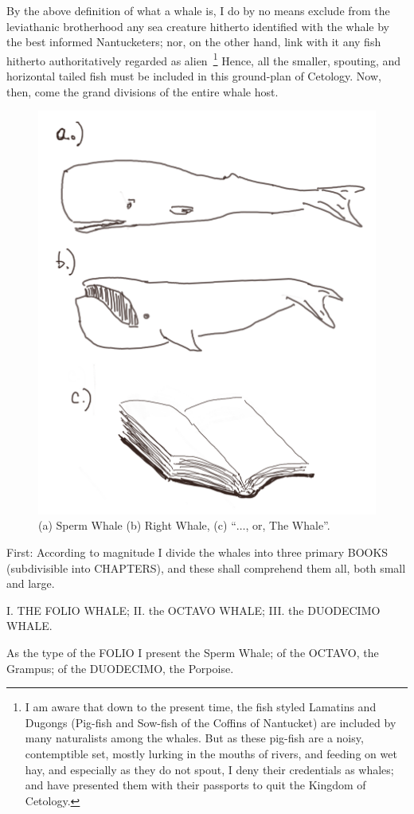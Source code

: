 By the above definition of what a whale is, I do by no means exclude from the leviathanic brotherhood any sea creature hitherto identified with the whale by the best informed Nantucketers; nor, on the other hand, link with it any fish hitherto authoritatively regarded as alien~\footnote{I am aware that down to the present time, the fish styled Lamatins and Dugongs (Pig-fish and Sow-fish of the Coffins of Nantucket) are included by many naturalists among the whales. But as these pig-fish are a noisy, contemptible set, mostly lurking in the mouths of rivers, and feeding on wet hay, and especially as they do not spout, I deny their credentials as whales; and have presented them with their passports to quit the Kingdom of Cetology.} Hence, all the smaller, spouting, and horizontal tailed fish must be included in this ground-plan of Cetology. Now, then, come the grand divisions of the entire whale host.

\begin{figure}
\begin{center}
\includegraphics[width=0.40\hsize]{Neutrino/NF01/figures/Whales.png}
\end{center}
\caption{(a) Sperm Whale (b) Right Whale, (c) ``$\ldots$, or, The Whale''.}
\label{fig:NF1-Whale}
\end{figure}

First: According to magnitude I divide the whales into three primary BOOKS (subdivisible into CHAPTERS), and these shall comprehend them all, both small and large.

I. THE FOLIO WHALE; II. the OCTAVO WHALE; III. the DUODECIMO WHALE.

As the type of the FOLIO I present the Sperm Whale; of the OCTAVO, the Grampus; of the DUODECIMO, the Porpoise.

